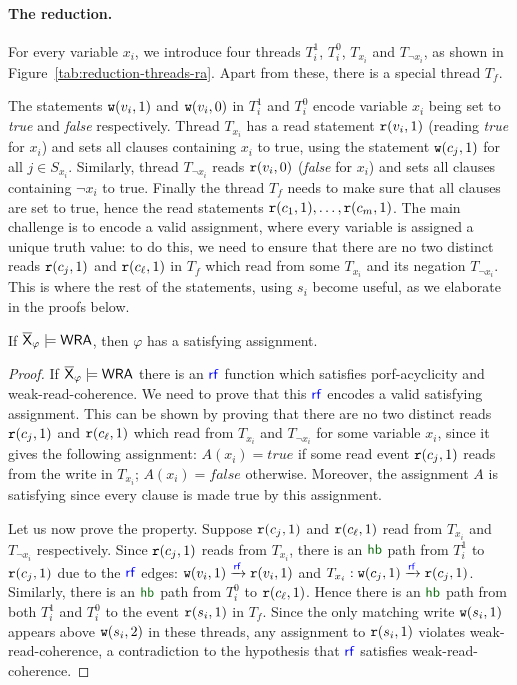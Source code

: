 \paragraph*{The reduction.} 
 For every variable $x_i$, we introduce four threads $T_i^1$, $T_i^0$, $T_{x_i}$ and $T_{\neg x_i}$, as shown in Figure~\ref{tab:reduction-threads-ra}. Apart from these, there is a special thread $T_f$. 

The statements $\mathtt{w}(v_i, 1)$ and $\mathtt{w}(v_i,0)$ in $T_i^1$ and $T_i^0$ encode variable $x_i$ being set to \emph{true} and \emph{false} respectively. Thread $T_{x_i}$ has a read statement $\mathtt{r}(v_i,1)$ (reading \emph{true} for $x_i$) and sets all clauses containing $x_i$ to true, using the statement $\mathtt{w}(c_j, 1)$ for all $j \in S_{x_i}$. Similarly, thread $T_{\neg x_i}$ reads $\mathtt{r}(v_i, 0)$ (\emph{false} for $x_i$) and sets all clauses containing $\neg x_i$ to true. Finally the thread $T_{f}$ needs to make sure that all clauses are set to true, hence the read statements $\mathtt{r}(c_1, 1), \dots, \mathtt{r}(c_m, 1)$.  The main challenge is to encode a valid assignment, where every variable is assigned a unique truth value: to do this, we need to ensure that there are no two distinct reads $\mathtt{r}(c_{j}, 1)$ and $\mathtt{r}(c_\ell, 1)$ in $T_f$ which read from some $T_{x_i}$ and its negation $T_{\neg x_i}$.
This is where the rest of the statements, using $s_i$ become useful, as we elaborate in the proofs below.

\begin{lemma}\label{lem:wra-eth}
If  $\overline{\mathsf{\color{black}X}}_\varphi \models \mathsf{WRA}$, then $\varphi$ has a satisfying assignment. 
\end{lemma}
\begin{proof} 
    If $\overline{\mathsf{\color{black}X}}_\varphi \models \mathsf{WRA}$ there is an $\rf$ function which satisfies porf-acyclicity and weak-read-coherence. We need to prove that this $\rf$ encodes a valid satisfying assignment. This can be shown by proving that there are no two distinct reads $\mathtt{r}(c_j, 1)$ and $\mathtt{r}(c_\ell, 1)$ which read from $T_{x_i}$ and $T_{\neg x_i}$ for some variable $x_i$, since it gives the following assignment: $A(x_i) = true$ if some read event $\mathtt{r}(c_j, 1)$ reads from the write in $T_{x_i}$; $A(x_i) = false$ otherwise. Moreover, the assignment $A$ is satisfying since every clause is made  true by this assignment.
    

    Let us now prove the property. Suppose $\mathtt{r}(c_j, 1)$ and $\mathtt{r}(c_\ell, 1)$ read from $T_{x_i}$ and $T_{\neg x_i}$ respectively. Since $\mathtt{r}(c_j, 1)$ reads from $T_{x_i}$, there is an $\hb$ path from $T_i^1$ to $\mathtt{r}(c_j, 1)$ due to the $\rf$ edges: $\wt(v_i, 1) \xra{\rf} \rd(v_i, 1)$ and $T_{x_i}: \wt(c_j, 1) \xra{\rf} \rd(c_j, 1)$. Similarly, there is an $\hb$ path from $T_i^0$ to $\mathtt{r}(c_\ell, 1)$. Hence there is an $\hb$ path from both $T_i^1$ and $T_i^0$ to the event $\mathtt{r}(s_i, 1)$ in $T_f$. Since the only matching write $\mathtt{w}(s_i, 1)$ appears above $\mathtt{w}(s_i, 2)$ in these threads, any assignment to $\mathtt{r}(s_i, 1)$ violates weak-read-coherence, a contradiction to the hypothesis that $\rf$ satisfies weak-read-coherence.
\end{proof}

